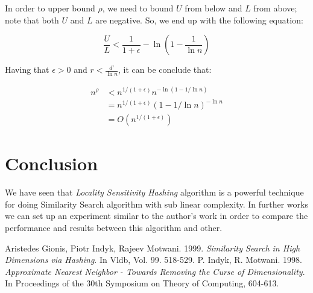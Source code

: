 \documentclass[12pt, a4paper]{article}
\theoremstyle{definition}
\begin{document}
In order to upper bound $\rho$, we need to bound $U$ from below and $L$ from above; note that both $U$ and $L$ are negative. So, we end up with the following equation:

\begin{equation*}
\frac{U}{L} < \frac{1}{1+\epsilon} - \ln{(1-\frac{1}{\ln n})}
\end{equation*}


Having that $\epsilon > 0$ and $r < \frac{d'}{\ln{n}}$, it can be conclude that:


\begin{subequations}
  \begin{align}
    n^{\rho} &< n^{1/(1+\epsilon)} n^{- \ln{(1-1/\ln n)}} \\
             &= n^{1/(1+\epsilon)} (1-1/\ln n)^{-\ln n} \\
             &= O(n^{1/(1+\epsilon)})
  \end{align}
\end{subequations}



\section{Conclusion}
We have seen that \textit{Locality Sensitivity Hashing} algorithm is a powerful technique for doing Similarity Search algorithm with sub linear complexity.
In further works we can set up an experiment similar to the author's work in order to compare the performance and results between this algorithm and other.




\begin{thebibliography}{9}
  Aristedes Gionis, Piotr Indyk, Rajeev Motwani. 1999. \textit{Similarity Search in High Dimensions via Hashing}. In Vldb, Vol. 99. 518-529.
  P. Indyk, R. Motwani. 1998. \textit{Approximate Nearest Neighbor - Towards Removing the Curse of Dimensionality}. In Proceedings of the 30th Symposium on Theory of Computing, 604-613.
\end{thebibliography}
\end{document}
